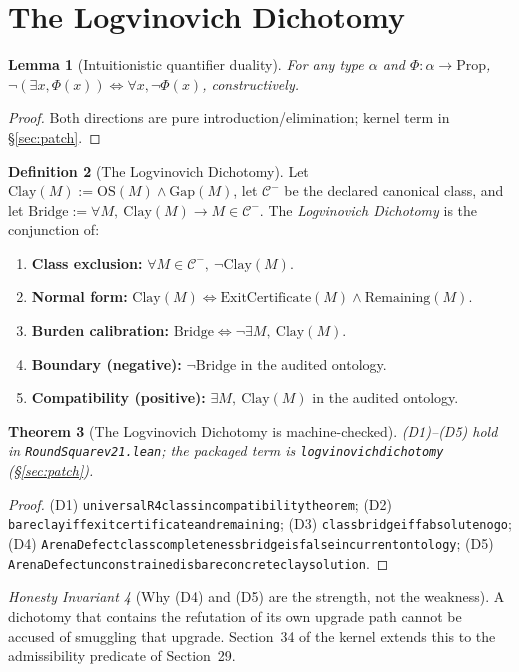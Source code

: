 \documentclass[11pt,a4paper]{article}
\theoremstyle{plain}
\newtheorem{theorem}{Theorem}[section]
\newtheorem{lemma}[theorem]{Lemma}
\theoremstyle{definition}
\newtheorem{definition}[theorem]{Definition}
\theoremstyle{remark}
\newtheorem{invariant}[theorem]{Honesty Invariant}
\newcommand{\OS}{\mathrm{OS}}\newcommand{\Gap}{\mathrm{Gap}}
\newcommand{\Class}{\mathcal{C}}\newcommand{\Htot}{\mathcal{H}}
\renewcommand{\_}{\oldunderscore\allowbreak}
\newcommand{\Lean}[1]{\texttt{\small #1}}
\begin{document}
\section{The Logvinovich Dichotomy}\label{sec:dichotomy}
\begin{lemma}[Intuitionistic quantifier duality]\label{lem:duality}
For any type $\alpha$ and $\Phi:\alpha\to\mathrm{Prop}$,
$\neg(\exists x,\Phi(x))\iff\forall x,\neg\Phi(x)$, constructively.
\end{lemma}
\begin{proof}
Both directions are pure introduction/elimination; kernel term in \S\ref{sec:patch}.
\end{proof}
\begin{definition}[The Logvinovich Dichotomy]\label{def:dichotomy}
Let $\mathrm{Clay}(M):=\OS(M)\wedge\Gap(M)$, let $\Class^-$ be the declared canonical class, and
let $\mathrm{Bridge}:=\forall M,\ \mathrm{Clay}(M)\to M\in\Class^-$. The \emph{Logvinovich
Dichotomy} is the conjunction of:
\begin{enumerate}[label=(D\arabic*),leftmargin=26pt,itemsep=1pt]
\item \textbf{Class exclusion:} $\forall M\in\Class^-,\ \neg\mathrm{Clay}(M)$.
\item \textbf{Normal form:} $\mathrm{Clay}(M)\iff\mathrm{ExitCertificate}(M)\wedge
\mathrm{Remaining}(M)$.
\item \textbf{Burden calibration:} $\mathrm{Bridge}\iff\neg\exists M,\ \mathrm{Clay}(M)$.
\item \textbf{Boundary (negative):} $\neg\mathrm{Bridge}$ in the audited ontology.
\item \textbf{Compatibility (positive):} $\exists M,\ \mathrm{Clay}(M)$ in the audited ontology.
\end{enumerate}
\end{definition}
\begin{theorem}[The Logvinovich Dichotomy is machine-checked]\label{thm:dichotomy}
(D1)--(D5) hold in \texttt{RoundSquare\_v21.lean}; the packaged term is
\Lean{logvinovich\_dichotomy} (\S\ref{sec:patch}).
\end{theorem}
\begin{proof}
(D1) \Lean{universal\_R4\_class\_incompatibility\_theorem}; (D2)
\Lean{bare\_clay\_iff\_exit\_certificate\_and\_remaining}; (D3)
\Lean{class\_bridge\_iff\_absolute\_no\_go}; (D4)
\Lean{ArenaDefect\_class\_completeness\_bridge\_is\_false\_in\_current\_ontology}; (D5)
\Lean{ArenaDefect\_unconstrained\_is\_bare\_concrete\_clay\_solution}.
\end{proof}
\begin{invariant}[Why (D4) and (D5) are the strength, not the weakness]\label{inv:selflimit}
A dichotomy that contains the refutation of its own upgrade path cannot be accused of smuggling
that upgrade. Section~34 of the kernel extends this to the admissibility predicate of
Section~29.
\end{invariant}
\end{document}
